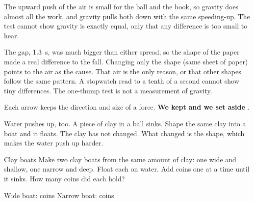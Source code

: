 The upward push of the air is small for the ball and the book, so gravity does almost all the work, and gravity pulls both down with the same speeding-up. The test cannot show gravity is exactly equal, only that any difference is too small to hear.

{The gap, 1.3~s, was much bigger than either spread, so the shape of the paper made a real difference to the fall. Changing only the shape (same sheet of paper) points to the air as the cause.}
{That air is the only reason, or that other shapes follow the same pattern. A stopwatch read to a tenth of a second cannot show tiny differences. The one-thump test is not a measurement of gravity.}

\begin{keepbox}
Each arrow keeps the direction and size of a force. \textbf{We kept} \wline[3.4cm] \textbf{and we set aside} \wline[3.4cm].
\end{keepbox}

\clearpage

Water pushes up, too. A piece of clay in a ball sinks. Shape the same clay into a boat and it floats. The clay has not changed. What changed is the shape, which makes the water push up harder.

\begin{center}
\end{center}

\begin{tryit}{Clay boats}
Make two clay boats from the same amount of clay: one wide and shallow, one narrow and deep. Float each on water. Add coins one at a time until it sinks. How many coins did each hold?\par\medskip
Wide boat: \wline[1.6cm] coins \qquad Narrow boat: \wline[1.6cm] coins
\end{tryit}

